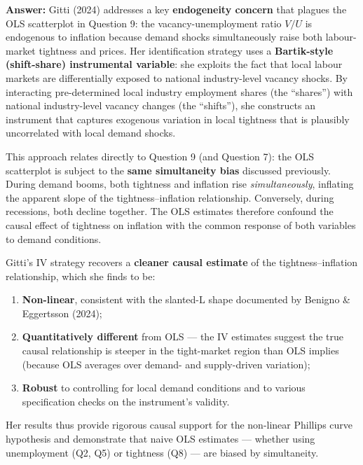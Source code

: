 \documentclass[
  12pt,
]{article}
\providecommand{\tightlist}{%
  \setlength{\itemsep}{0pt}\setlength{\parskip}{0pt}}
\begin{document}
\textbf{Answer:} Gitti (2024) addresses a key \textbf{endogeneity
concern} that plagues the OLS scatterplot in Question 9: the
vacancy-unemployment ratio \(V/U\) is endogenous to inflation because
demand shocks simultaneously raise both labour-market tightness and
prices. Her identification strategy uses a \textbf{Bartik-style
(shift-share) instrumental variable}: she exploits the fact that local
labour markets are differentially exposed to national industry-level
vacancy shocks. By interacting pre-determined local industry employment
shares (the ``shares'') with national industry-level vacancy changes
(the ``shifts''), she constructs an instrument that captures exogenous
variation in local tightness that is plausibly uncorrelated with local
demand shocks.

This approach relates directly to Question 9 (and Question 7): the OLS
scatterplot is subject to the \textbf{same simultaneity bias} discussed
previously. During demand booms, both tightness and inflation rise
\emph{simultaneously}, inflating the apparent slope of the
tightness--inflation relationship. Conversely, during recessions, both
decline together. The OLS estimates therefore confound the causal effect
of tightness on inflation with the common response of both variables to
demand conditions.

Gitti's IV strategy recovers a \textbf{cleaner causal estimate} of the
tightness--inflation relationship, which she finds to be:

\begin{enumerate}
\def\labelenumi{\arabic{enumi}.}
\tightlist
\item
  \textbf{Non-linear}, consistent with the slanted-L shape documented by
  Benigno \& Eggertsson (2024);
\item
  \textbf{Quantitatively different} from OLS --- the IV estimates
  suggest the true causal relationship is steeper in the tight-market
  region than OLS implies (because OLS averages over demand- and
  supply-driven variation);
\item
  \textbf{Robust} to controlling for local demand conditions and to
  various specification checks on the instrument's validity.
\end{enumerate}

Her results thus provide rigorous causal support for the non-linear
Phillips curve hypothesis and demonstrate that naive OLS estimates ---
whether using unemployment (Q2, Q5) or tightness (Q8) --- are biased by
simultaneity.

\newpage
\end{document}
